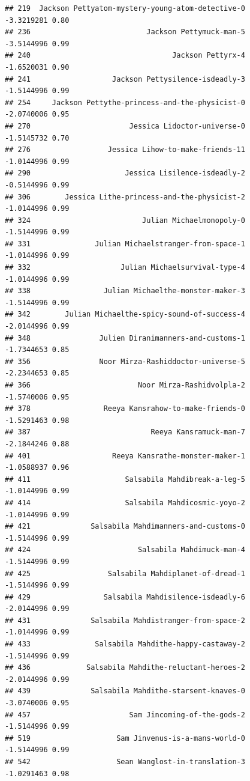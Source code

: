 \documentclass[
]{article}
\begin{document}
\begin{verbatim}
## 219  Jackson Pettyatom-mystery-young-atom-detective-0         -3.3219281 0.80
## 236                           Jackson Pettymuck-man-5         -3.5144996 0.99
## 240                                 Jackson Pettyrx-4         -1.6520031 0.90
## 241                   Jackson Pettysilence-isdeadly-3         -1.5144996 0.99
## 254     Jackson Pettythe-princess-and-the-physicist-0         -2.0740006 0.95
## 270                       Jessica Lidoctor-universe-0         -1.5145732 0.70
## 276                  Jessica Lihow-to-make-friends-11         -1.0144996 0.99
## 290                      Jessica Lisilence-isdeadly-2         -0.5144996 0.99
## 306        Jessica Lithe-princess-and-the-physicist-2         -1.0144996 0.99
## 324                          Julian Michaelmonopoly-0         -1.5144996 0.99
## 331               Julian Michaelstranger-from-space-1         -1.0144996 0.99
## 332                     Julian Michaelsurvival-type-4         -1.0144996 0.99
## 338                 Julian Michaelthe-monster-maker-3         -1.5144996 0.99
## 342        Julian Michaelthe-spicy-sound-of-success-4         -2.0144996 0.99
## 348                Julien Diranimanners-and-customs-1         -1.7344653 0.85
## 356                Noor Mirza-Rashiddoctor-universe-5         -2.2344653 0.85
## 366                         Noor Mirza-Rashidvolpla-2         -1.5740006 0.95
## 378                 Reeya Kansrahow-to-make-friends-0         -1.5291463 0.98
## 387                            Reeya Kansramuck-man-7         -2.1844246 0.88
## 401                   Reeya Kansrathe-monster-maker-1         -1.0588937 0.96
## 411                      Salsabila Mahdibreak-a-leg-5         -1.0144996 0.99
## 414                      Salsabila Mahdicosmic-yoyo-2         -1.0144996 0.99
## 421              Salsabila Mahdimanners-and-customs-0         -1.5144996 0.99
## 424                         Salsabila Mahdimuck-man-4         -1.5144996 0.99
## 425                  Salsabila Mahdiplanet-of-dread-1         -1.5144996 0.99
## 429                 Salsabila Mahdisilence-isdeadly-6         -2.0144996 0.99
## 431              Salsabila Mahdistranger-from-space-2         -1.0144996 0.99
## 433               Salsabila Mahdithe-happy-castaway-2         -1.5144996 0.99
## 436             Salsabila Mahdithe-reluctant-heroes-2         -2.0144996 0.99
## 439              Salsabila Mahdithe-starsent-knaves-0         -3.0740006 0.95
## 457                       Sam Jincoming-of-the-gods-2         -1.5144996 0.99
## 519                    Sam Jinvenus-is-a-mans-world-0         -1.5144996 0.99
## 542                    Sean Wanglost-in-translation-3         -1.0291463 0.98

\end{verbatim}
\end{document}
